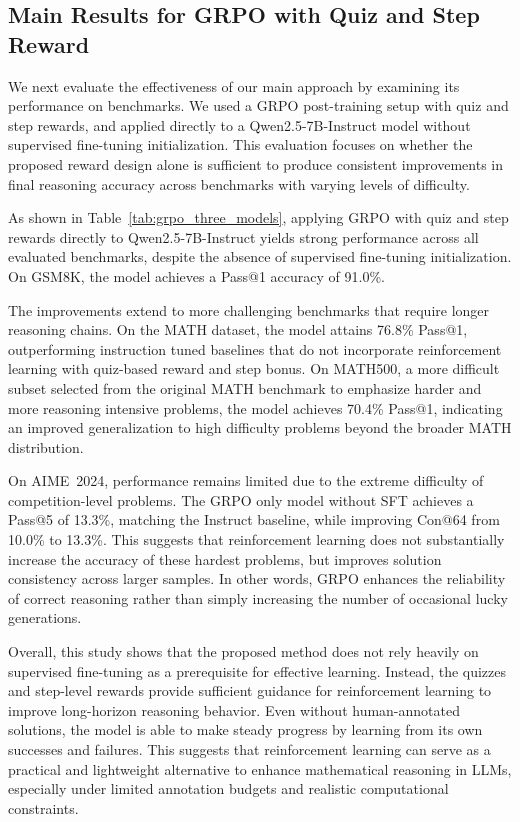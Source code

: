 \documentclass[12pt]{report}
\begin{document}
\subsection{Main Results for GRPO with Quiz and Step Reward}
\label{sec:main_results}

We next evaluate the effectiveness of our main approach by examining its performance on benchmarks.
We used a GRPO post-training setup with quiz and step rewards, and applied directly to a Qwen2.5-7B-Instruct model without supervised fine-tuning
initialization.
This evaluation focuses on whether the proposed reward design alone is sufficient to produce consistent improvements in final reasoning accuracy across benchmarks with varying levels of difficulty.

As shown in Table~\ref{tab:grpo_three_models}, applying GRPO with quiz and step rewards directly to Qwen2.5-7B-Instruct yields strong performance across all evaluated benchmarks, despite the absence of supervised fine-tuning initialization. On GSM8K, the model achieves a Pass@1 accuracy of 91.0\%.

The improvements extend to more challenging benchmarks that require longer reasoning chains. On the MATH dataset, the model attains 76.8\% Pass@1, outperforming instruction tuned baselines that do not incorporate reinforcement learning with quiz-based reward and step bonus. On MATH500, a more difficult subset selected from the original MATH benchmark to emphasize harder and more reasoning intensive problems, the model achieves 70.4\% Pass@1, indicating an improved generalization to high difficulty problems beyond the broader MATH distribution. 

On AIME~2024, performance remains limited due to the extreme difficulty of competition-level problems. The GRPO only model without SFT achieves a Pass@5 of 13.3\%, matching the Instruct baseline, while improving Con@64 from 10.0\% to 13.3\%. This suggests that reinforcement learning does not substantially increase the accuracy of these hardest problems, but improves solution consistency across larger samples. In other words, GRPO enhances the reliability of correct reasoning rather than simply increasing the number of occasional lucky generations.

Overall, this study shows that the proposed method does not rely heavily on supervised fine-tuning as a prerequisite for effective learning. Instead, the quizzes and step-level rewards provide sufficient guidance for reinforcement learning to improve long-horizon reasoning behavior. Even without human-annotated solutions, the model is able to make steady progress by learning from its own successes and failures. This suggests that reinforcement learning can serve as a practical and lightweight alternative to enhance mathematical reasoning in LLMs, especially under limited annotation budgets and realistic computational constraints.
\end{document}
